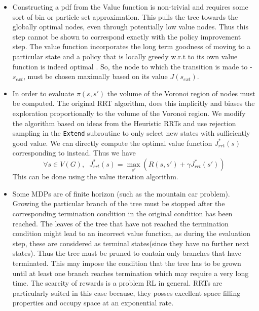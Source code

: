 \documentclass[wcp]{jmlr}
\begin{document}
\begin{itemize} 
\item Constructing a pdf from the Value function is non-trivial and requires some sort of bin or particle set approximation. This pulls the tree towards the globally optimal nodes, even through potentially low value nodes. Thus this step cannot be shown to correspond exactly with the  policy improvement step. The value function incorporates the long term goodness of moving to a particular state and a policy that is locally greedy w.r.t to its own value function is indeed optimal \citep{rlbook}. So, the node to which the transition is made to - $s_{ext}$, must be chosen maximally based on its value $J(s_{ext})$.  

\item In order to evaluate $\pi(s,s')$ the volume of the Voronoi region of nodes must be computed. The original RRT algorithm, does this implicitly and biases the exploration proportionally to the volume of the Voronoi region. We modify the algorithm based on ideas from the Heuristic RRTs \citep{heuristicrrt} and use rejection sampling in the \texttt{Extend} subroutine to only select new states with sufficiently good value. We can directly compute the optimal value function $J_{rrt}^*(s)$ corresponding to  instead. Thus we have
\begin{equation}
\label{eq:polmax}
\forall s \in V(G),\;\; J_{rrt}^*(s) = \max_{s'}( R(s,s') + \gamma J_{rrt}^*(s'))
\end{equation}
This can be done using the value iteration algorithm.


\item Some MDPs are of finite horizon (such as the mountain car problem). Growing the particular branch of the tree must be stopped after the corresponding termination condition in the original condition has been reached. The leaves of the tree that have not reached the termination condition might lead to an incorrect value function, as during the evaluation step, these are considered as terminal states(since they have no further next states). Thus the tree must be pruned to contain only branches that have terminated. This may impose the condition that the tree has to be grown until at least one branch reaches termination which may require a very long time. The scarcity of rewards is a problem RL in general. RRTs are particularly suited in this case because, they posses excellent space filling properties and occupy space at an exponential rate.


\end{itemize}
\end{document}
